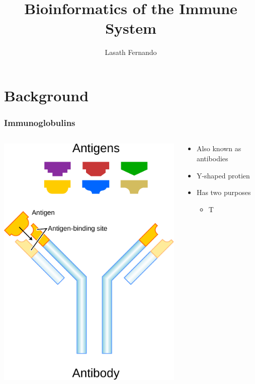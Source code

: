 \documentclass{beamer}
\begin{document}
\title{Bioinformatics of the Immune System}
\author{Lasath Fernando}

\begin{frame}
\titlepage
\end{frame}

\section{Background}
\begin{frame}
  \frametitle{Immunoglobulins}

  \begin{columns}
    \begin{column}{5cm}
    \includegraphics[width=\textwidth]{antibody.pdf}
    \end{column}
    \begin{column}{5cm}
    \begin{itemize}
     \item Also known as antibodies
     \item Y-shaped protien
     \item Has two purposes
     \begin{itemize}
      \item T
     \end{itemize}


\end{itemize}
\end{column}
\end{columns}
\end{frame}
\end{document}
